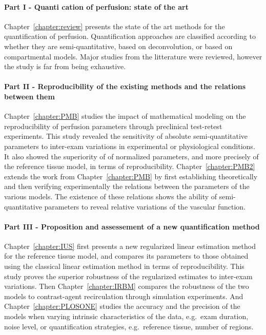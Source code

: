 \paragraph{Part I - Quanti cation of perfusion: state of the art}
Chapter~\ref{chapter:review} presents the state of the art methods for the quantification of perfusion.
Quantification approaches are classified according to whether they are semi-quantitative, based on deconvolution, or based on compartmental models.
Major studies from the litterature were reviewed, however the study is far from being exhaustive.

\paragraph{Part II - Reproducibility of the existing methods and the relations between them}
Chapter~\ref{chapter:PMB} studies the impact of mathematical modeling on the reproducibility of perfusion parameters through preclinical test-retest experiments.
This study revealed the sensitivity of absolute semi-quantitative parameters to inter-exam variations in experimental or physiological conditions.
It also showed the superiority of of normalized parameters, and more precisely of the reference tissue model, in terms of reproducibility.
Chapter~\ref{chapter:PMB2} extends the work from Chapter~\ref{chapter:PMB} by first establishing theoretically and then verifying experimentally the relations between the parameters of the various models.
The existence of these relations shows the ability of semi-quantitative parameters to reveal relative variations of the vascular function.

\paragraph{Part III - Proposition and assessement of a new quantification method}
Chapter~\ref{chapter:IUS} first presents a new regularized linear estimation method for the reference tissue model, and compares its parameters to those obtained using the classical linear estimation method in terms of reproducibility.
This study proves the superior robustness of the regularized estimates to inter-exam variations.
Then Chapter~\ref{chapter:IRBM} compares the robustness of the two models to contrast-agent recirculation through simulation experiments.
And Chapter~\ref{chapter:PLOSONE} studies the accuracy and the precision of the models when varying intrinsic characteristics of the data, e.g.~exam duration, noise level, or quantification strategies, e.g.~reference tissue, number of regions.

\newpage

